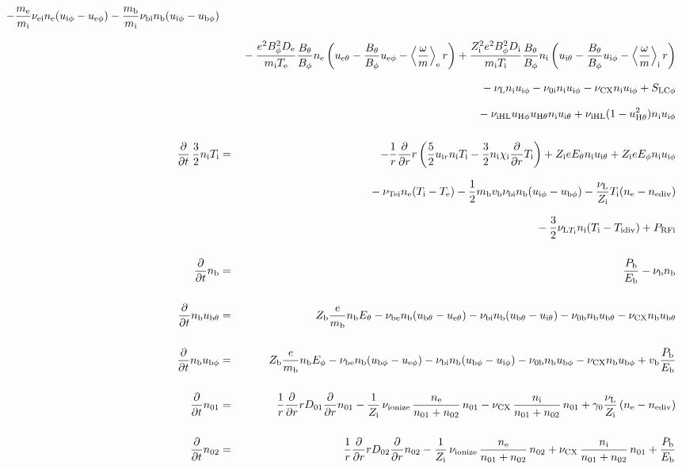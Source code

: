 \documentclass[11pt]{article}
\def\r#1{{\rm#1}}
\def\ddt{\frac{\partial}{\partial t}}
\def\ddr{\frac{\partial}{\partial r}}
\def\ave#1{\left\langle#1\right\rangle}
\def\me{m_\r{e}}
\def\mi{m_\r{i}}
\def\mb{m_\r{b}}
\def\De{D_\r{e}}
\def\Di{D_\r{i}}
\def\chii{\chi_\r{i}}
\def\ne{n_\r{e}}
\def\ni{n_\r{i}}
\def\nb{n_\r{b}}
\def\uir{u_{\r{i}r}}
\def\ueth{u_{\r{e}\theta}}
\def\uith{u_{\r{i}\theta}}
\def\ubth{u_{\r{b}\theta}}
\def\ueph{u_{\r{e}\phi}}
\def\uiph{u_{\r{i}\phi}}
\def\ubph{u_{\r{b}\phi}}
\def\Eth{E_\theta}
\def\Eph{E_\phi}
\def\Bth{B_\theta}
\def\Bph{B_\phi}
\def\Te{T_\r{e}}
\def\Ti{T_\r{i}}
\def\nna{n_{01}}
\def\nnb{n_{02}}
\def\Zi{Z_\r{i}}
\def\Zb{Z_\r{b}}
\def\Pb{P_\r{b}}
\def\Eb{E_\r{b}}
\def\PRFi{P_\r{RFi}}
\def\nuNCi{\nu_\r{NCi}}
\def\nuei{\nu_\r{ei}}
\def\nube{\nu_\r{be}}
\def\nubi{\nu_\r{bi}}
\def\nuni{\nu_\r{0i}}
\def\nunb{\nu_\r{0b}}
\def\nuL{\nu_\r{L}}
\def\nuCX{\nu_\r{CX}}
\def\nuion{\nu_\r{ionize}}
\def\nub{\nu_\r{b}}
\def\nuTei{\nu_\r{Tei}}
\def\vb{v_\r{b}}
\def\nediv{n_\r{ediv}}
\def\Tidiv{T_\r{idiv}}
\def\nuLTi{\nu_{\r{L}T_\r{i}}}
\begin{document}
\begin{eqnarray}
%
  - \frac{\me}{\mi} \nuei \ne (\uiph - \ueph)
%
  - \frac{\mb}{\mi} \nubi \nb (\uiph - \ubph)
\nonumber\\[2.5mm]&&{}
%
  - \frac{e^2 \Bph^2 \De}{\mi\Te}\frac{\Bth}{\Bph}\ne
    \left(\ueth - \frac{\Bth}{\Bph}\ueph - \ave{\frac{\omega}{m}}_\r{e}
     r \right)
%
  + \frac{\Zi^2 e^2 \Bph^2 \Di}{\mi\Ti}\frac{\Bth}{\Bph}\ni
    \left(\uith - \frac{\Bth}{\Bph}\uiph - \ave{\frac{\omega}{m}}_\r{i}
     r \right)
\nonumber\\[2.5mm]&&{}
%
  - \nuL \ni \uiph
%
  - \nuni \ni \uiph
%
  - \nuCX \ni \uiph
%
  + S_\r{LC\phi}
\nonumber\\[2.5mm]&&{}
%
  - \nu_\r{iHL} u_{\r{H}\phi} u_{\r{H}\theta} \ni \uith
%
  + \nu_\r{iHL} (1 - u_{\r{H}\theta}^2) \ni \uiph
\\[5mm]
%
%
  \ddt \, \frac{3}{2} \ni \Ti &=&
%
 - \frac{1}{r} \ddr r
   \left( \frac{5}{2} \uir \ni \Ti - \frac{3}{2} \ni \chii \ddr \Ti \right)
%
  + \Zi e \Eth \ni \uith
%
  + \Zi e \Eph \ni \uiph
\nonumber\\[2.5mm]&&{}
%
  - \nuTei \ne (\Ti - \Te)
%
  - \frac{1}{2} \mb \vb \nubi \nb (\uiph - \ubph)
%
  - \frac{\nuL}{\Zi} \Ti (\ne - \nediv)
\nonumber\\[2.5mm]&&{}
%
  - \frac{3}{2} \nuLTi \ni (\Ti - \Tidiv)
%
  + \PRFi
\\[5mm]
%
%
  \ddt \nb &=&
%
    \frac{\Pb}{\Eb}
%
  - \nub \nb
\\[5mm]
%
%
  \ddt \nb \ubth &=&
%
    \Zb \frac{e}{\mb} \nb \Eth
%
%
  - \nube \nb (\ubth - \ueth)
%
  - \nubi \nb (\ubth - \uith)
%
  - \nunb \nb \ubth
%
  - \nuCX \nb \ubth
\\[5mm]
%
%
  \ddt \nb \ubph &=&
%
  \Zb \frac{e}{\mb} \nb \Eph
%
  - \nube \nb (\ubph - \ueph)
%
  - \nubi \nb (\ubph - \uiph)
%
  - \nunb \nb \ubph
%
  - \nuCX \nb \ubph
%
  + \vb \frac{\Pb}{\Eb}
\\[5mm]
%
%
  \ddt \nna &=& 
%
    \frac{1}{r} \ddr r D_{01} \ddr \nna
%
  - \frac{1}{\Zi}\, \nuion\, \frac{\ne}{\nna+\nnb}\, \nna
%
  - \nuCX\, \frac{\ni}{\nna+\nnb}\, \nna
%
  + \gamma_0 \frac{\nuL}{\Zi} \, (\ne - \nediv)
\\[5mm]
%
%
  \ddt \nnb &=& 
%
    \frac{1}{r} \ddr r D_{02} \ddr \nnb
%
  - \frac{1}{\Zi}\, \nuion\, \frac{\ne}{\nna+\nnb}\, \nnb
%
  + \nuCX\, \frac{\ni}{\nna+\nnb}\, \nna
%
  + \frac{\Pb}{\Eb}
\end{eqnarray}
\end{document}
